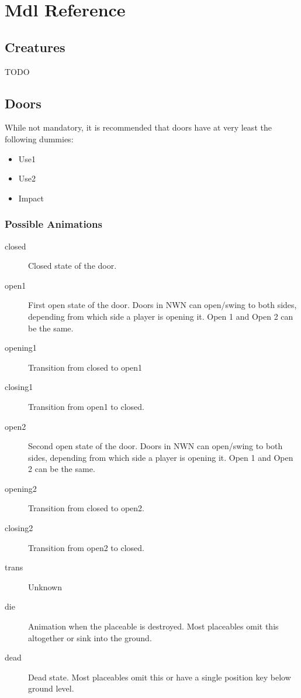 \chapter{Mdl Reference}

\section{Creatures}
TODO

\section{Doors}
While not mandatory, it is recommended that doors have at very least the
following dummies:
\begin{itemize}
\item Use1
\item Use2
\item Impact
\end{itemize}

\subsection*{Possible Animations}
\begin{description}
    \item[closed] Closed state of the door.
    \item[open1] First open state of the door. Doors in NWN can open/swing to both sides, depending from which side a player is opening it. Open 1 and Open 2 can be the same.
    \item[opening1] Transition from closed to open1
    \item[closing1] Transition from open1 to closed.
    \item[open2] Second open state of the door. Doors in NWN can open/swing to both sides, depending from which side a player is opening it. Open 1 and Open 2 can be the same.
    \item[opening2] Transition from closed to open2.
    \item[closing2] Transition from open2 to closed.
    \item[trans] Unknown
    \item[die] Animation when the placeable is destroyed. Most placeables omit this altogether or sink into the ground.
    \item[dead] Dead state. Most placeables omit this or have a single position key below ground level.
\end{description}

